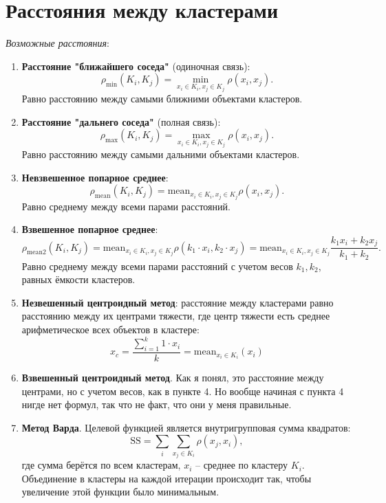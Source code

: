 \documentclass[a4paper, 12pt]{article}
\begin{document}
\section{Расстояния между кластерами}

{\it Возможные расстояния}:
\begin{enumerate}
    \item \textbf{Расстояние "ближайшего соседа"} (одиночная связь): $$\rho_{\min}(K_i,K_j)=\min_{x_i \in K_i, x_j \in K_j} \rho (x_i,x_j).$$ Равно расстоянию между самыми ближними объектами кластеров.
    \item \textbf{Расстояние "дальнего соседа"} (полная связь):$$\rho_{\max}(K_i,K_j)=\max_{x_i \in K_i, x_j \in K_j} \rho (x_i,x_j).$$ Равно расстоянию между самыми дальними объектами кластеров.
    \item \textbf{Невзвешенное попарное среднее}: $$\rho_{\text{mean}}(K_i,K_j)=\text{mean}_{x_i \in K_i, x_j \in K_j} \rho (x_i,x_j).$$ Равно среднему между всеми парами расстояний.
    \item \textbf{Взвешенное попарное среднее}: $$\rho_{\text{mean2}}(K_i,K_j)=\text{mean}_{x_i \in K_i, x_j \in K_j} \rho (k_1 \cdot x_i,k_2 \cdot x_j) = \text{mean}_{x_i \in K_i, x_j \in K_j} \dfrac{k_1 x_i + k_2 x_j}{k_1+k_2}.$$ Равно среднему между всеми парами расстояний с учетом весов $k_1,k_2$, равных ёмкости кластеров.
    \item \textbf{Незвешенный центроидный метод}: расстояние между кластерами равно расстоянию между их центрами тяжести, где центр тяжести есть среднее арифметическое всех объектов в кластере: $$x_c = \dfrac{\sum_{i=1}^k 1 \cdot x_i}{k}= \text{mean}_{x_i \in K_i} (x_i)$$
    \item \textbf{Взвешенный центроидный метод}. Как я понял, это расстояние между центрами, но с учетом весов, как в пункте 4. Но вообще начиная с пункта 4 нигде нет формул, так что не факт, что они у меня правильные.
    \item \textbf{Метод Варда}. Целевой функцией является внутригрупповая сумма квадратов: $$\text{SS}=\sum_i \sum_{x_j \in K_i} \rho(x_j,x_i),$$
    где сумма берётся по всем кластерам, $x_i$ -- среднее по кластеру $K_i$. Объединение в кластеры на каждой итерации происходит так, чтобы увеличение этой функции было минимальным.
\end{enumerate}
\end{document}
